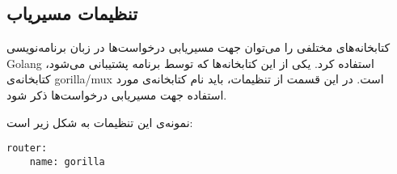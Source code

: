 \subsection*{تنظیمات مسیریاب}
کتابخانه‌های مختلفی را می‌توان جهت مسیریابی درخواست‌ها در زبان برنامه‌نویسی Golang استفاده کرد. یکی از این کتابخانه‌ها که توسط برنامه پشتیبانی می‌شود، کتابخانه‌ی gorilla/mux است. در این قسمت از تنظیمات، باید نام کتابخانه‌ی مورد استفاده جهت مسیریابی درخواست‌ها ذکر شود.

نمونه‌ی این تنظیمات به شکل زیر است:

\begin{latin}
    \begin{lstlisting}
router:
    name: gorilla
    \end{lstlisting}
\end{latin}
